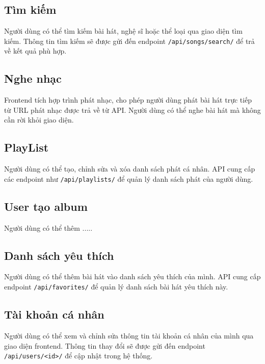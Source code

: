 \subsection{Tìm kiếm}
Người dùng có thể tìm kiếm bài hát, nghệ sĩ hoặc thể loại qua giao diện tìm kiếm. Thông tin tìm kiếm sẽ được gửi đến endpoint \texttt{/api/songs/search/} để trả về kết quả phù hợp.

\subsection{Nghe nhạc}
Frontend tích hợp trình phát nhạc, cho phép người dùng phát bài hát trực tiếp từ URL phát nhạc được trả về từ API. Người dùng có thể nghe bài hát mà không cần rời khỏi giao diện.

\subsection{PlayList}
Người dùng có thể tạo, chỉnh sửa và xóa danh sách phát cá nhân. API cung cấp các endpoint như \texttt{/api/playlists/} để quản lý danh sách phát của người dùng.
\subsection{User tạo album}
Người dùng có thể thêm .....
\subsection{Danh sách yêu thích}
Người dùng có thể thêm bài hát vào danh sách yêu thích của mình. API cung cấp endpoint \texttt{/api/favorites/} để quản lý danh sách bài hát yêu thích này.

\subsection{Tài khoản cá nhân}
Người dùng có thể xem và chỉnh sửa thông tin tài khoản cá nhân của mình qua giao diện frontend. Thông tin thay đổi sẽ được gửi đến endpoint \texttt{/api/users/<id>/} để cập nhật trong hệ thống.
